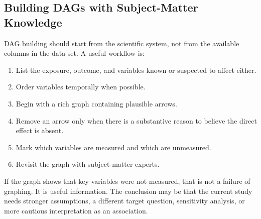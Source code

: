 \subsection{Building DAGs with Subject-Matter Knowledge}

DAG building should start from the scientific system, not from the available columns in the data set. A useful workflow is:
\begin{enumerate}
  \item List the exposure, outcome, and variables known or suspected to affect either.
  \item Order variables temporally when possible.
  \item Begin with a rich graph containing plausible arrows.
  \item Remove an arrow only when there is a substantive reason to believe the direct effect is absent.
  \item Mark which variables are measured and which are unmeasured.
  \item Revisit the graph with subject-matter experts.
\end{enumerate}

If the graph shows that key variables were not measured, that is not a failure of graphing. It is useful information. The conclusion may be that the current study needs stronger assumptions, a different target question, sensitivity analysis, or more cautious interpretation as an association.
